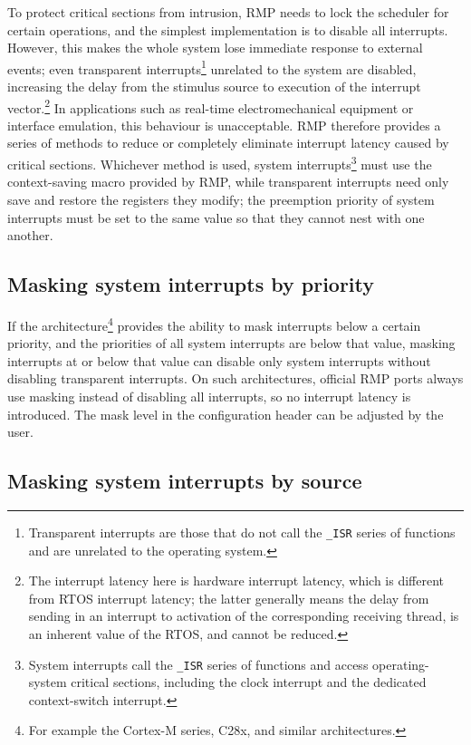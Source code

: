 To protect critical sections from intrusion, RMP needs to lock the scheduler for certain operations, and the simplest implementation is to disable all interrupts.
However, this makes the whole system lose immediate response to external events; even transparent interrupts\footnote{Transparent interrupts are those that do not call the \texttt{\_ISR} series of functions and are unrelated to the operating system.} unrelated to the system are disabled, increasing the delay from the stimulus source to execution of the interrupt vector.\footnote{The interrupt latency here is hardware interrupt latency, which is different from RTOS interrupt latency; the latter generally means the delay from sending in an interrupt to activation of the corresponding receiving thread, is an inherent value of the RTOS, and cannot be reduced.}
In applications such as real-time electromechanical equipment or interface emulation, this behaviour is unacceptable.
RMP therefore provides a series of methods to reduce or completely eliminate interrupt latency caused by critical sections.
Whichever method is used, system interrupts\footnote{System interrupts call the \texttt{\_ISR} series of functions and access operating-system critical sections, including the clock interrupt and the dedicated context-switch interrupt.} must use the context-saving macro provided by RMP, while transparent interrupts need only save and restore the registers they modify; the preemption priority of system interrupts must be set to the same value so that they cannot nest with one another.

\subsection{Masking system interrupts by priority}

If the architecture\footnote{For example the Cortex-M series, C28x, and similar architectures.} provides the ability to mask interrupts below a certain priority, and the priorities of all system interrupts are below that value, masking interrupts at or below that value can disable only system interrupts without disabling transparent interrupts.
On such architectures, official RMP ports always use masking instead of disabling all interrupts, so no interrupt latency is introduced.
The mask level in the configuration header can be adjusted by the user.

\subsection{Masking system interrupts by source}

